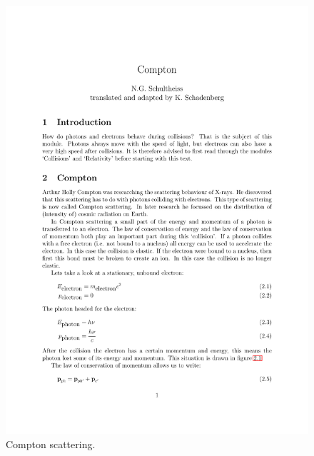 \begin{figure}\begin{center}
\includegraphics[scale=3]{compton}%
\caption{Compton scattering.}\label{fig:coll}
\end{center}\end{figure}

